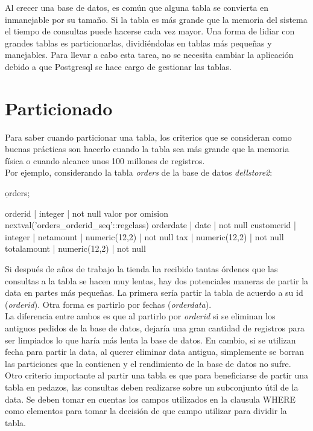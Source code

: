 Al crecer una base de datos, es común que alguna tabla se convierta en inmanejable por su tamaño. Si la tabla es más grande que la memoria del sistema el tiempo de consultas puede hacerse cada vez mayor. Una forma de lidiar con grandes tablas es particionarlas, dividiéndolas en tablas más pequeñas y manejables. Para llevar a cabo esta tarea, no se necesita cambiar la aplicación debido a que Postgresql se hace cargo de gestionar las tablas.

\section{Particionado}

Para saber cuando particionar una tabla, los criterios que se consideran como buenas prácticas son hacerlo cuando la tabla sea más grande que la memoria física o cuando alcance unos 100 millones de registros.\\

Por ejemplo, considerando la tabla \textit{orders} de la base de datos \textit{dellstore2}:\\

\begin{pyglist}
\d orders;

 orderid     | integer       | not null valor por omision 
                               nextval('orders_orderid_seq'::regclass)
 orderdate   | date          | not null
 customerid  | integer       | 
 netamount   | numeric(12,2) | not null
 tax         | numeric(12,2) | not null
 totalamount | numeric(12,2) | not null
\end{pyglist}

Si después de años de trabajo la tienda ha recibido tantas órdenes que las consultas a la tabla se hacen muy lentas, hay dos potenciales maneras de partir la data en partes más pequeñas. La primera sería partir la tabla de acuerdo a su id (\textit{orderid}). Otra forma es partirlo por fechas (\textit{orderdata}).\\

La diferencia entre ambos es que al partirlo por \textit{orderid} si se eliminan los antiguos pedidos de la base de datos, dejaría una gran cantidad de registros para ser limpiados lo que haría más lenta la base de datos. En cambio, si se utilizan fecha para partir la data, al querer eliminar data antigua, simplemente se borran las particiones que la contienen y el rendimiento de la base de datos no sufre.\\

Otro criterio importante al partir una tabla es que para beneficiarse de partir una tabla en pedazos, las consultas deben realizarse  sobre un subconjunto útil de la data. Se deben tomar en cuentas los  campos utilizados en la clausula WHERE como elementos para tomar la decisión de que campo utilizar para dividir la tabla.

